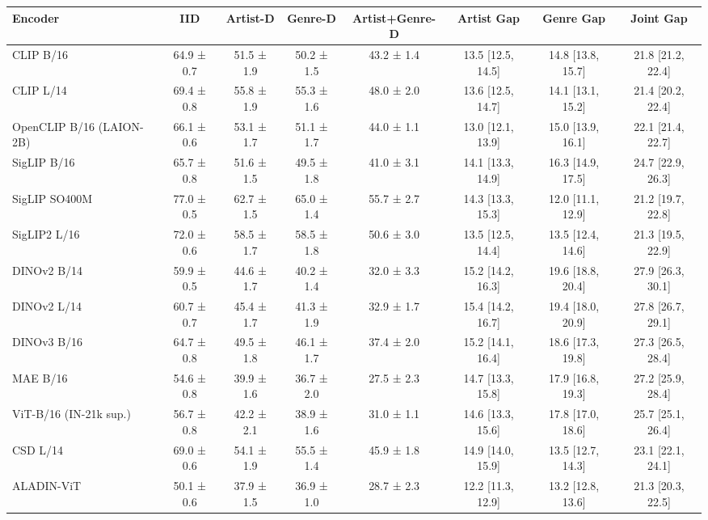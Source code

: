 \begin{tabular}{lccccccc}
\toprule
Encoder & IID & Artist-D & Genre-D & Artist+Genre-D & Artist Gap & Genre Gap & Joint Gap \\
\midrule
CLIP B/16 & 64.9 ± 0.7 & 51.5 ± 1.9 & 50.2 ± 1.5 & 43.2 ± 1.4 & 13.5 [12.5, 14.5] & 14.8 [13.8, 15.7] & 21.8 [21.2, 22.4] \\
CLIP L/14 & 69.4 ± 0.8 & 55.8 ± 1.9 & 55.3 ± 1.6 & 48.0 ± 2.0 & 13.6 [12.5, 14.7] & 14.1 [13.1, 15.2] & 21.4 [20.2, 22.4] \\
OpenCLIP B/16 (LAION-2B) & 66.1 ± 0.6 & 53.1 ± 1.7 & 51.1 ± 1.7 & 44.0 ± 1.1 & 13.0 [12.1, 13.9] & 15.0 [13.9, 16.1] & 22.1 [21.4, 22.7] \\
SigLIP B/16 & 65.7 ± 0.8 & 51.6 ± 1.5 & 49.5 ± 1.8 & 41.0 ± 3.1 & 14.1 [13.3, 14.9] & 16.3 [14.9, 17.5] & 24.7 [22.9, 26.3] \\
SigLIP SO400M & 77.0 ± 0.5 & 62.7 ± 1.5 & 65.0 ± 1.4 & 55.7 ± 2.7 & 14.3 [13.3, 15.3] & 12.0 [11.1, 12.9] & 21.2 [19.7, 22.8] \\
SigLIP2 L/16 & 72.0 ± 0.6 & 58.5 ± 1.7 & 58.5 ± 1.8 & 50.6 ± 3.0 & 13.5 [12.5, 14.4] & 13.5 [12.4, 14.6] & 21.3 [19.5, 22.9] \\
DINOv2 B/14 & 59.9 ± 0.5 & 44.6 ± 1.7 & 40.2 ± 1.4 & 32.0 ± 3.3 & 15.2 [14.2, 16.3] & 19.6 [18.8, 20.4] & 27.9 [26.3, 30.1] \\
DINOv2 L/14 & 60.7 ± 0.7 & 45.4 ± 1.7 & 41.3 ± 1.9 & 32.9 ± 1.7 & 15.4 [14.2, 16.7] & 19.4 [18.0, 20.9] & 27.8 [26.7, 29.1] \\
DINOv3 B/16 & 64.7 ± 0.8 & 49.5 ± 1.8 & 46.1 ± 1.7 & 37.4 ± 2.0 & 15.2 [14.1, 16.4] & 18.6 [17.3, 19.8] & 27.3 [26.5, 28.4] \\
MAE B/16 & 54.6 ± 0.8 & 39.9 ± 1.6 & 36.7 ± 2.0 & 27.5 ± 2.3 & 14.7 [13.3, 15.8] & 17.9 [16.8, 19.3] & 27.2 [25.9, 28.4] \\
ViT-B/16 (IN-21k sup.) & 56.7 ± 0.8 & 42.2 ± 2.1 & 38.9 ± 1.6 & 31.0 ± 1.1 & 14.6 [13.3, 15.6] & 17.8 [17.0, 18.6] & 25.7 [25.1, 26.4] \\
CSD L/14 & 69.0 ± 0.6 & 54.1 ± 1.9 & 55.5 ± 1.4 & 45.9 ± 1.8 & 14.9 [14.0, 15.9] & 13.5 [12.7, 14.3] & 23.1 [22.1, 24.1] \\
ALADIN-ViT & 50.1 ± 0.6 & 37.9 ± 1.5 & 36.9 ± 1.0 & 28.7 ± 2.3 & 12.2 [11.3, 12.9] & 13.2 [12.8, 13.6] & 21.3 [20.3, 22.5] \\
\bottomrule
\end{tabular}
